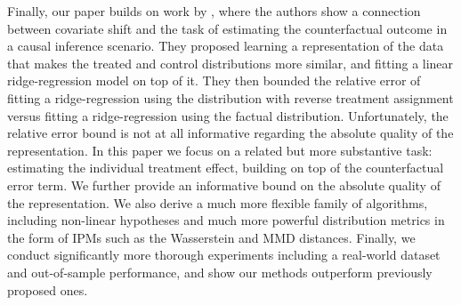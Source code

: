 Finally, our paper builds on work by \citet{johansson2016counterfactual}, where the authors show a connection between covariate shift and the task of estimating the counterfactual outcome in a causal inference scenario. They proposed learning a representation of the data that makes the treated and control distributions more similar, and fitting a linear ridge-regression model on top of it. They then bounded the relative error of fitting a ridge-regression using the distribution with reverse treatment  assignment versus fitting a ridge-regression using the factual distribution. Unfortunately, the relative error bound is not at all informative regarding the absolute quality of the representation. In this paper we focus on a related but more substantive task: estimating the individual treatment effect, building on top of the counterfactual error term. We further provide an informative bound on the absolute quality of the representation. We also derive a much more flexible family of algorithms, including non-linear hypotheses and much more powerful distribution metrics in the form of IPMs such as the Wasserstein and MMD distances. Finally, we conduct significantly more thorough experiments including a real-world dataset and out-of-sample performance, and show our methods outperform previously proposed ones.
